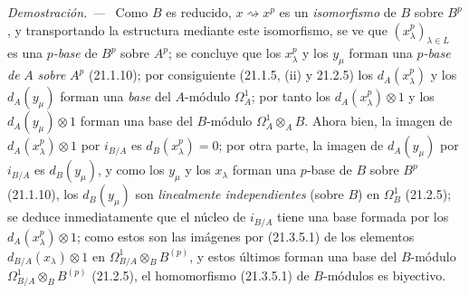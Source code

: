 \documentclass[10pt,oneside]{book}
\newcommand{\oldpage}[2][]{%
  \setcounter{footnote}{0}%
  \marginpar{\scriptsize\textbf{#1}~|~#2}\ignorespaces}
\newenvironment{proof}{%
  \par\medskip\noindent\textit{Demostración. ---\ }}{\par}
\begin{document}
\begin{proof}
\oldpage[0\textsubscript{IV-1}]{162}
Como $B$ es reducido, $x\rightsquigarrow x^p$ es un \emph{isomorfismo} de $B$
sobre $B^p$, y transportando la estructura mediante este isomorfismo, se ve
que $(x_\lambda^p)_{\lambda\in L}$ es una \emph{$p$-base} de
$B^p$ sobre $A^p$; se concluye que los $x_\lambda^p$ y los $y_\mu$ forman
una \emph{$p$-base de} $A$ \emph{sobre} $A^p$ (21.1.10); por consiguiente (21.1.5, (ii) y
21.2.5) los $d_A(x_\lambda^p)$ y los $d_A(y_\mu)$ forman una \emph{base} del $A$-módulo
$\Omega^1_A$; por tanto los $d_A(x_\lambda^p)\otimes1$ y los $d_A(y_\mu)\otimes1$
forman una base del $B$-módulo $\Omega^1_A\otimes_A B$. Ahora bien, la imagen de $d_A(x_\lambda^p)\otimes1$ por
$i_{B/A}$ es $d_B(x_\lambda^p)=0$; por otra parte, la imagen de $d_A(y_\mu)$
por $i_{B/A}$ es $d_B(y_\mu)$, y como los $y_\mu$ y los $x_\lambda$
forman una $p$-base de $B$ sobre $B^p$ (21.1.10), los $d_B(y_\mu)$ son
\emph{linealmente independientes} (sobre $B$) en $\Omega^1_B$ (21.2.5); se deduce inmediatamente
que el núcleo de $i_{B/A}$ tiene una base formada por
los $d_A(x_\lambda^p)\otimes1$; como estos son las imágenes por (21.3.5.1) de
los elementos $d_{B/A}(x_\lambda)\otimes1$ en $\Omega^1_{B/A}\otimes_B B^{(p)}$, y estos últimos
forman una base del $B$-módulo $\Omega^1_{B/A}\otimes_B B^{(p)}$ (21.2.5), el
homomorfismo (21.3.5.1) de $B$-módulos es biyectivo.
\end{proof}
\end{document}
